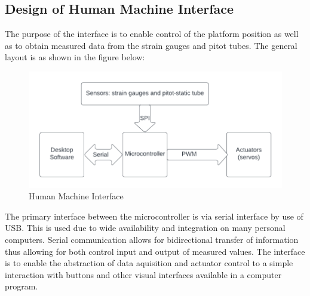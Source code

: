 \subsection{Design of Human Machine Interface}
The purpose of the interface is to enable control of the platform position as well as to obtain measured data from the strain gauges and pitot tubes. 
The general layout is as shown in the figure below:
\begin{center}
\begin{figure}
\centering
\includegraphics{Figures/interface}
\caption[Human Machine Interface]{Human Machine Interface}
\end{figure}
\end{center}

The primary interface between the microcontroller is via serial interface by use of USB. This is used due to wide availability and integration on many personal computers. Serial communication allows for bidirectional transfer of information thus allowing for both control input and output of measured values. The interface is to enable the abstraction of data aquisition and actuator control to a simple interaction with buttons and other visual interfaces available in a computer program.

